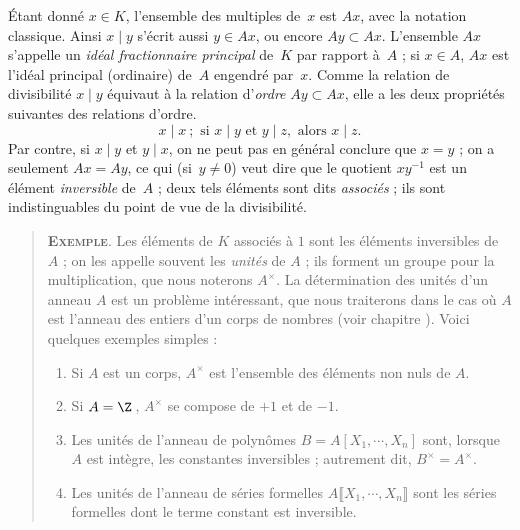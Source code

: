 \documentclass[11pt, useosf,
  title in boldface,
  theorem in new line,
  theorem numbering = section,
  number theorems separately,
]{simplivre}
\begin{document}
    Étant donné \( x \in K \), l'ensemble des multiples de~\( x \) est \( Ax \), avec la notation classique. Ainsi \( x \mid y \) s'écrit aussi \( y \in Ax \), ou encore \( Ay \subset Ax \). L'ensemble \( Ax \) s'appelle un \emph{idéal fractionnaire principal} de~\( K \) par rapport à~\( A \) ; si \( x \in A \), \( Ax \) est l'idéal principal (ordinaire) de~\( A \) engendré par~\( x \). Comme la relation de divisibilité \( x \mid y \) équivaut à la relation d'\emph{ordre} \( Ay \subset Ax \), elle a les deux propriétés suivantes des relations d'ordre.
    \begin{equation}
        x \mid x  ~;
        \text{ si } x \mid y \text{ et } y \mid z, \text{ alors } x \mid z.
    \end{equation}
    Par contre, si \( x \mid y \) et \( y \mid x \), on ne peut pas en général conclure que \( x = y \) ; on a seulement \( Ax = Ay \), ce qui (si~\( y \neq 0 \)) veut dire que le quotient \( x y^{-1} \) est un élément \emph{inversible} de~\( A \) ; deux tels éléments sont dits \emph{associés} ; ils sont indistinguables du point de vue de la divisibilité.

    \begin{quote}
        \textsc{\textbf{Exemple}}.
        Les éléments de \( K \) associés à \( 1 \) sont les éléments inversibles de \( A \) ; on les appelle souvent les \emph{unités} de \( A \) ; ils forment un groupe pour la multiplication, que nous noterons \( A^\times \). La détermination des unités d'un anneau \( A \) est un problème intéressant, que nous traiterons dans le cas où \( A \) est l'anneau des entiers d'un corps de nombres (voir chapitre ). Voici quelques exemples simples :
        \begin{enumerate}
            \item Si \( A \) est un corps, \( A^\times \) est l'ensemble des éléments non nuls de \( A \).
            \item Si \( A = \Z \)\,, \( A^\times \) se compose de \( +1 \) et de \( -1 \).
            \item Les unités de l'anneau de polynômes \( B = A[X_1, \cdots, X_n] \) sont, lorsque \( A \) est intègre, les constantes inversibles ; autrement dit, \( B^\times = A^\times \).
            \item Les unités de l'anneau de séries formelles \( A\lBrack X_1, \cdots, X_n \rBrack \) sont les séries formelles dont le terme constant est inversible.
        \end{enumerate}
    \end{quote}
\end{document}
